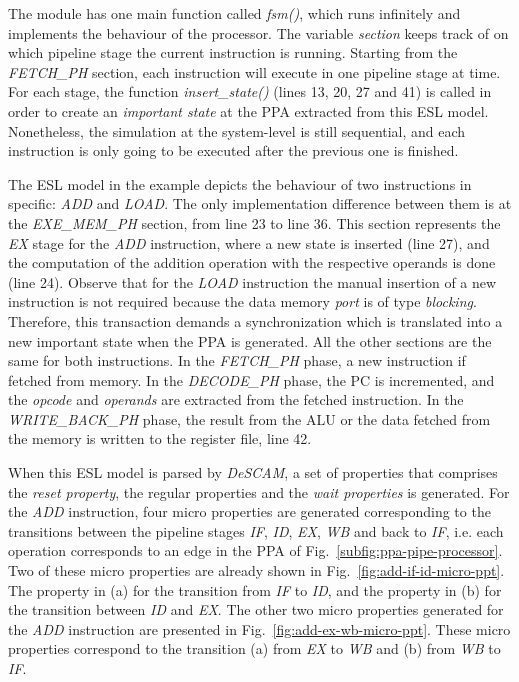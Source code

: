 The module has one main function called \textit{fsm()}, which runs infinitely and implements the behaviour of the processor. The variable \textit{section} keeps track of on which pipeline stage the current instruction is running. Starting from the \textit{FETCH\_PH} section, each instruction will execute in one pipeline stage at time. For each stage, the function \textit{insert\_state()} (lines 13, 20, 27 and 41) is called in order to create an \textit{important state} at the PPA extracted from this ESL model. Nonetheless, the simulation at the system-level is still sequential, and each instruction is only going to be executed after the previous one is finished.

The ESL model in the example depicts the behaviour of two instructions in specific: \textit{ADD} and \textit{LOAD}. The only implementation difference between them is at the \textit{EXE\_MEM\_PH} section, from line 23 to line 36. This section represents the \textit{EX} stage for the \textit{ADD} instruction, where a new state is inserted (line 27), and the computation of the addition operation with the respective operands is done (line 24). Observe that for the \textit{LOAD} instruction the manual insertion of a new instruction is not required because the data memory \textit{port} is of type \textit{blocking}. Therefore, this transaction demands a synchronization which is translated into a new important state when the PPA is generated. All the other sections are the same for both instructions. In the \textit{FETCH\_PH} phase, a new instruction if fetched from memory. In the \textit{DECODE\_PH} phase, the PC is incremented, and the \textit{opcode} and \textit{operands} are extracted from the fetched instruction. In the \textit{WRITE\_BACK\_PH} phase, the result from the ALU or the data fetched from the memory is written to the register file, line 42.

When this ESL model is parsed by \textit{DeSCAM}, a set of properties that comprises the \textit{reset property}, the regular properties and the \textit{wait properties} is generated. For the \textit{ADD} instruction, four micro properties are generated corresponding to the transitions between the pipeline stages \textit{IF}, \textit{ID}, \textit{EX}, \textit{WB} and back to \textit{IF}, i.e. each operation corresponds to an edge in the PPA of Fig.~\ref{subfig:ppa-pipe-processor}. Two of these micro properties are already shown in Fig.~\ref{fig:add-if-id-micro-ppt}. The property in (a) for the transition from \textit{IF} to \textit{ID}, and the property in (b) for the transition between \textit{ID} and \textit{EX}. The other two micro properties generated for the \textit{ADD} instruction are presented in Fig.~\ref{fig:add-ex-wb-micro-ppt}. These micro properties correspond to the transition (a) from \textit{EX} to \textit{WB}  and (b) from \textit{WB} to \textit{IF}. 

